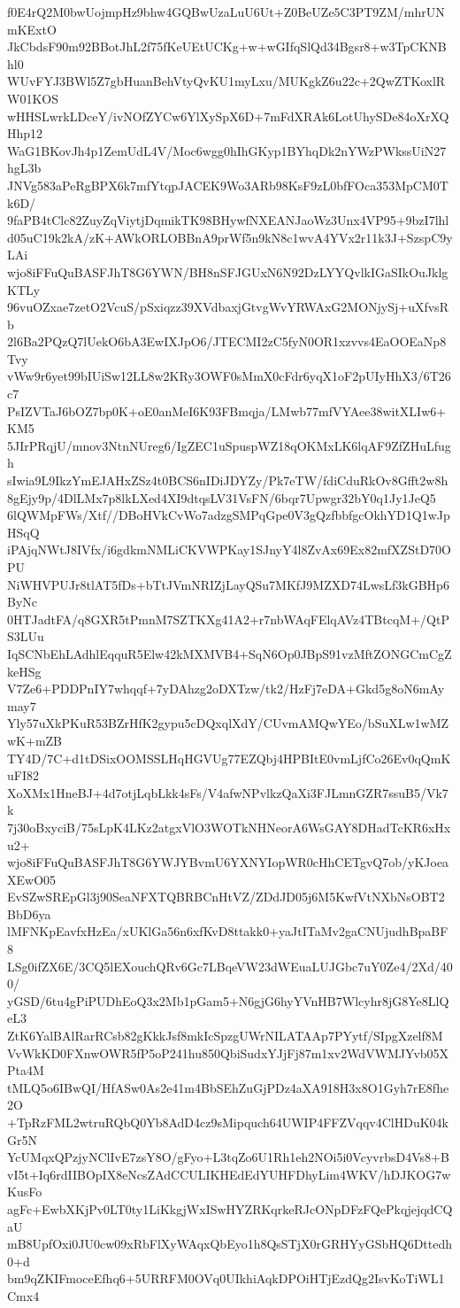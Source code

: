 f0E4rQ2M0bwUojmpHz9bhw4GQBwUzaLuU6Ut+Z0BeUZe5C3PT9ZM/mhrUNmKExtO
JkCbdsF90m92BBotJhL2f75fKeUEtUCKg+w+wGIfqSlQd34Bgsr8+w3TpCKNBhl0
WUvFYJ3BWl5Z7gbHuanBehVtyQvKU1myLxu/MUKgkZ6u22c+2QwZTKoxlRW01KOS
wHHSLwrkLDceY/ivNOfZYCw6YlXySpX6D+7mFdXRAk6LotUhySDe84oXrXQHhp12
WaG1BKovJh4p1ZemUdL4V/Moc6wgg0hIhGKyp1BYhqDk2nYWzPWkssUiN27hgL3b
JNVg583aPeRgBPX6k7mfYtqpJACEK9Wo3ARb98KsF9zL0bfFOca353MpCM0Tk6D/
9faPB4tClc82ZuyZqViytjDqmikTK98BHywfNXEANJaoWz3Unx4VP95+9bzI7lhl
d05uC19k2kA/zK+AWkORLOBBnA9prWf5n9kN8c1wvA4YVx2r11k3J+SzspC9yLAi
wjo8iFFuQuBASFJhT8G6YWN/BH8nSFJGUxN6N92DzLYYQvlkIGaSIkOuJklgKTLy
96vuOZxae7zetO2VcuS/pSxiqzz39XVdbaxjGtvgWvYRWAxG2MONjySj+uXfvsRb
2l6Ba2PQzQ7lUekO6bA3EwIXJpO6/JTECMI2zC5fyN0OR1xzvvs4EaOOEaNp8Tvy
vWw9r6yet99bIUiSw12LL8w2KRy3OWF0sMmX0cFdr6yqX1oF2pUIyHhX3/6T26c7
PsIZVTaJ6bOZ7bp0K+oE0anMeI6K93FBmqja/LMwb77mfVYAee38witXLIw6+KM5
5JIrPRqjU/mnov3NtnNUreg6/IgZEC1uSpuspWZ18qOKMxLK6lqAF9ZfZHuLfugh
sIwia9L9IkzYmEJAHxZSz4t0BCS6nIDiJDYZy/Pk7eTW/fdiCduRkOv8Gfft2w8h
8gEjy9p/4DlLMx7p8lkLXed4XI9dtqsLV31VsFN/6bqr7Upwgr32bY0q1Jy1JeQ5
6lQWMpFWs/Xtf//DBoHVkCvWo7adzgSMPqGpe0V3gQzfbbfgcOkhYD1Q1wJpHSqQ
iPAjqNWtJ8IVfx/i6gdkmNMLiCKVWPKay1SJnyY4l8ZvAx69Ex82mfXZStD70OPU
NiWHVPUJr8tlAT5fDs+bTtJVmNRIZjLayQSu7MKfJ9MZXD74LwsLf3kGBHp6ByNc
0HTJadtFA/q8GXR5tPmnM7SZTKXg41A2+r7nbWAqFElqAVz4TBtcqM+/QtPS3LUu
IqSCNbEhLAdhlEqquR5Elw42kMXMVB4+SqN6Op0JBpS91vzMftZONGCmCgZkeHSg
V7Ze6+PDDPnIY7whqqf+7yDAhzg2oDXTzw/tk2/HzFj7eDA+Gkd5g8oN6mAymay7
Yly57uXkPKuR53BZrHfK2gypu5cDQxqlXdY/CUvmAMQwYEo/bSuXLw1wMZwK+mZB
TY4D/7C+d1tDSixOOMSSLHqHGVUg77EZQbj4HPBItE0vmLjfCo26Ev0qQmKuFI82
XoXMx1HneBJ+4d7otjLqbLkk4sFs/V4afwNPvlkzQaXi3FJLmnGZR7ssuB5/Vk7k
7j30oBxyciB/75sLpK4LKz2atgxVlO3WOTkNHNeorA6WsGAY8DHadTcKR6xHxu2+
wjo8iFFuQuBASFJhT8G6YWJYBvmU6YXNYIopWR0cHhCETgvQ7ob/yKJoeaXEwO05
EvSZwSREpGl3j90SeaNFXTQBRBCnHtVZ/ZDdJD05j6M5KwfVtNXbNsOBT2BbD6ya
lMFNKpEavfxHzEa/xUKlGa56n6xfKvD8ttakk0+yaJtITaMv2gaCNUjudhBpaBF8
LSg0ifZX6E/3CQ5lEXouchQRv6Gc7LBqeVW23dWEuaLUJGbc7uY0Ze4/2Xd/400/
yGSD/6tu4gPiPUDhEoQ3x2Mb1pGam5+N6gjG6hyYVnHB7Wlcyhr8jG8Ye8LlQeL3
ZtK6YalBAlRarRCsb82gKkkJsf8mkIcSpzgUWrNILATAAp7PYytf/SIpgXzelf8M
VvWkKD0FXnwOWR5fP5oP241hu850QbiSudxYJjFj87m1xv2WdVWMJYvb05XPta4M
tMLQ5o6IBwQI/HfASw0As2e41m4BbSEhZuGjPDz4aXA918H3x8O1Gyh7rE8fhe2O
+TpRzFML2wtruRQbQ0Yb8AdD4cz9sMipquch64UWIP4FFZVqqv4ClHDuK04kGr5N
YcUMqxQPzjyNClIvE7zsY8O/gFyo+L3tqZo6U1Rh1eh2NOi5i0VcyvrbsD4Vs8+B
vI5t+Iq6rdIIBOpIX8eNcsZAdCCULIKHEdEdYUHFDhyLim4WKV/hDJKOG7wKusFo
agFc+EwbXKjPv0LT0ty1LiKkgjWxISwHYZRKqrkeRJcONpDFzFQePkqjejqdCQaU
mB8UpfOxi0JU0cw09xRbFlXyWAqxQbEyo1h8QsSTjX0rGRHYyGSbHQ6Dttedh0+d
bm9qZKIFmoceEfhq6+5URRFM0OVq0UIkhiAqkDPOiHTjEzdQg2IsvKoTiWL1Cmx4
